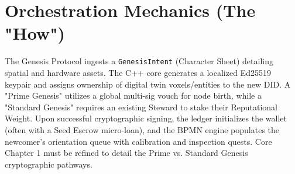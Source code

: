 \section{Orchestration Mechanics (The "How")}
The Genesis Protocol ingests a \texttt{GenesisIntent} (Character Sheet) detailing spatial and hardware assets. The C++ core generates a localized Ed25519 keypair and assigns ownership of digital twin voxels/entities to the new DID. A "Prime Genesis" utilizes a global multi-sig vouch for node birth, while a "Standard Genesis" requires an existing Steward to stake their Reputational Weight. Upon successful cryptographic signing, the ledger initializes the wallet (often with a Seed Escrow micro-loan), and the BPMN engine populates the newcomer's orientation queue with calibration and inspection quests. Core Chapter 1 must be refined to detail the Prime vs. Standard Genesis cryptographic pathways.
